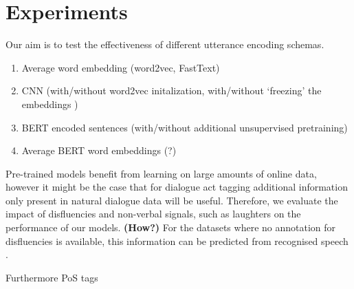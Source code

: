 \documentclass[11pt,a4paper]{article}
\begin{document}
\section{Experiments}
Our aim is to test the effectiveness of different utterance encoding schemas. 
\begin{enumerate}
  \item Average word embedding (word2vec, FastText)
  \item CNN (with/without word2vec initalization, with/without `freezing' the embeddings )
  \item BERT encoded sentences (with/without additional unsupervised pretraining)
  \item Average BERT word embeddings (?)
  \end{enumerate}

  Pre-trained models benefit from learning on large amounts of online data, however it might be the case that for dialogue act tagging additional information only present in natural dialogue data will be useful. Therefore, we evaluate the impact of disfluencies and non-verbal signals, such as laughters on the performance of our models. \textbf{(How?)} For the datasets where no annotation for disfluencies is available, this information can be predicted from recognised speech \citep{hough2017joint,shalyminov2018multi}.
  
  Furthermore PoS tags

{}

\end{document}
